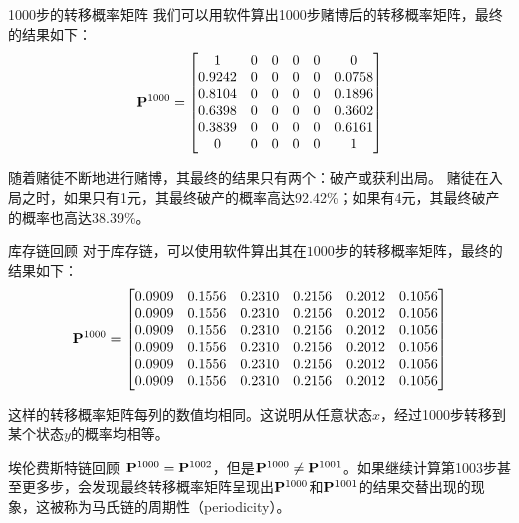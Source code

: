 \documentclass[t]{beamer}
\begin{document}
\begin{frame}{1000步的转移概率矩阵}
    我们可以用软件算出1000步赌博后的转移概率矩阵，最终的结果如下：
    \begin{equation*}
        {\bf P}^{1000}=\begin{bmatrix}  
            1     &    0   &      0   &      0    &     0  &       0\\
            0.9242  &  0   &      0  &  0  &      0  &  0.0758\\
            0.8104  &       0 &   0  &       0  &  0  &  0.1896\\
            0.6398  &  0      &   0  &  0  &      0  &  0.3602\\
            0.3839   &      0  &  0  &      0  &  0   & 0.6161\\
                 0  &       0  &       0  &       0    &     0 &   1\\
        \end{bmatrix} 
        \end{equation*} 

        随着赌徒不断地进行赌博，其最终的结果只有两个：破产或获利出局。
赌徒在入局之时，如果只有1元，其最终破产的概率高达92.42\%；如果有4元，其最终破产的概率也高达38.39\%。
\end{frame}


\begin{frame}{库存链回顾}
    对于库存链，可以使用软件算出其在$1000$步的转移概率矩阵，最终的结果如下：
    \[{\bf P}^{1000}=\begin{bmatrix}
        0.0909 & 0.1556 & 0.2310 & 0.2156 & 0.2012 & 0.1056\\
        0.0909 & 0.1556 & 0.2310 & 0.2156 & 0.2012 & 0.1056\\
        0.0909 & 0.1556 & 0.2310 & 0.2156 & 0.2012 & 0.1056\\
        0.0909 & 0.1556 & 0.2310 & 0.2156 & 0.2012 & 0.1056\\
        0.0909 & 0.1556 & 0.2310 & 0.2156 & 0.2012 & 0.1056\\
        0.0909 & 0.1556 & 0.2310 & 0.2156 & 0.2012 & 0.1056\\
        \end{bmatrix}\]

        这样的转移概率矩阵每列的数值均相同。这说明从任意状态$x$，经过1000步转移到某个状态$y$的概率均相等。
\end{frame}


\begin{frame}{埃伦费斯特链回顾}
    ${\bf P}^{1000}={\bf P}^{1002}$，但是${\bf P}^{1000}\ne {\bf P}^{1001}$。如果继续计算第1003步甚至更多步，会发现最终转移概率矩阵呈现出${\bf P}^{1000}$和${\bf P}^{1001}$的结果交替出现的现象，这被称为马氏链的周期性（periodicity）。
\end{frame}
\end{document}
